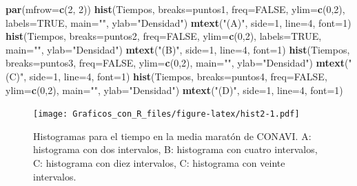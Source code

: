 \documentclass[10pt,]{krantz}
\makeatletter
\newenvironment{Shaded}{\begin{snugshade}}{\end{snugshade}}
\newcommand{\KeywordTok}[1]{\textcolor[rgb]{0.13,0.29,0.53}{\textbf{#1}}}
\newcommand{\DataTypeTok}[1]{\textcolor[rgb]{0.13,0.29,0.53}{#1}}
\newcommand{\DecValTok}[1]{\textcolor[rgb]{0.00,0.00,0.81}{#1}}
\newcommand{\StringTok}[1]{\textcolor[rgb]{0.31,0.60,0.02}{#1}}
\newcommand{\OtherTok}[1]{\textcolor[rgb]{0.56,0.35,0.01}{#1}}
\newcommand{\NormalTok}[1]{#1}
\newenvironment{kframe}{%
\medskip{}
\setlength{\fboxsep}{.8em}
 \def\at@end@of@kframe{}%
 \ifinner\ifhmode%
  \def\at@end@of@kframe{\end{minipage}}%
  \begin{minipage}{\columnwidth}%
 \fi\fi%
 \def\FrameCommand##1{\hskip\@totalleftmargin \hskip-\fboxsep
 \colorbox{shadecolor}{##1}\hskip-\fboxsep
     \hskip-\linewidth \hskip-\@totalleftmargin \hskip\columnwidth}%
 \MakeFramed {\advance\hsize-\width
   \@totalleftmargin\z@ \linewidth\hsize
   \@setminipage}}%
 {\par\unskip\endMakeFramed%
 \at@end@of@kframe}
\renewenvironment{Shaded}{\begin{kframe}}{\end{kframe}}
\makeatother
\begin{document}
\begin{Shaded}
\begin{Highlighting}[]
\KeywordTok{par}\NormalTok{(}\DataTypeTok{mfrow=}\KeywordTok{c}\NormalTok{(}\DecValTok{2}\NormalTok{, }\DecValTok{2}\NormalTok{))}
\KeywordTok{hist}\NormalTok{(Tiempos, }\DataTypeTok{breaks=}\NormalTok{puntos1, }\DataTypeTok{freq=}\OtherTok{FALSE}\NormalTok{, }\DataTypeTok{ylim=}\KeywordTok{c}\NormalTok{(}\DecValTok{0}\NormalTok{,}\DecValTok{2}\NormalTok{), }\DataTypeTok{labels=}\OtherTok{TRUE}\NormalTok{,}
     \DataTypeTok{main=}\StringTok{""}\NormalTok{, }\DataTypeTok{ylab=}\StringTok{"Densidad"}\NormalTok{)}
\KeywordTok{mtext}\NormalTok{(}\StringTok{"(A)"}\NormalTok{, }\DataTypeTok{side=}\DecValTok{1}\NormalTok{, }\DataTypeTok{line=}\DecValTok{4}\NormalTok{, }\DataTypeTok{font=}\DecValTok{1}\NormalTok{)}
\KeywordTok{hist}\NormalTok{(Tiempos, }\DataTypeTok{breaks=}\NormalTok{puntos2, }\DataTypeTok{freq=}\OtherTok{FALSE}\NormalTok{, }\DataTypeTok{ylim=}\KeywordTok{c}\NormalTok{(}\DecValTok{0}\NormalTok{,}\DecValTok{2}\NormalTok{), }\DataTypeTok{labels=}\OtherTok{TRUE}\NormalTok{,}
     \DataTypeTok{main=}\StringTok{""}\NormalTok{, }\DataTypeTok{ylab=}\StringTok{"Densidad"}\NormalTok{)}
\KeywordTok{mtext}\NormalTok{(}\StringTok{"(B)"}\NormalTok{, }\DataTypeTok{side=}\DecValTok{1}\NormalTok{, }\DataTypeTok{line=}\DecValTok{4}\NormalTok{, }\DataTypeTok{font=}\DecValTok{1}\NormalTok{)}
\KeywordTok{hist}\NormalTok{(Tiempos, }\DataTypeTok{breaks=}\NormalTok{puntos3, }\DataTypeTok{freq=}\OtherTok{FALSE}\NormalTok{, }\DataTypeTok{ylim=}\KeywordTok{c}\NormalTok{(}\DecValTok{0}\NormalTok{,}\DecValTok{2}\NormalTok{),}
     \DataTypeTok{main=}\StringTok{""}\NormalTok{, }\DataTypeTok{ylab=}\StringTok{"Densidad"}\NormalTok{)}
\KeywordTok{mtext}\NormalTok{(}\StringTok{"(C)"}\NormalTok{, }\DataTypeTok{side=}\DecValTok{1}\NormalTok{, }\DataTypeTok{line=}\DecValTok{4}\NormalTok{, }\DataTypeTok{font=}\DecValTok{1}\NormalTok{)}
\KeywordTok{hist}\NormalTok{(Tiempos, }\DataTypeTok{breaks=}\NormalTok{puntos4, }\DataTypeTok{freq=}\OtherTok{FALSE}\NormalTok{, }\DataTypeTok{ylim=}\KeywordTok{c}\NormalTok{(}\DecValTok{0}\NormalTok{,}\DecValTok{2}\NormalTok{),}
     \DataTypeTok{main=}\StringTok{""}\NormalTok{, }\DataTypeTok{ylab=}\StringTok{"Densidad"}\NormalTok{)}
\KeywordTok{mtext}\NormalTok{(}\StringTok{"(D)"}\NormalTok{, }\DataTypeTok{side=}\DecValTok{1}\NormalTok{, }\DataTypeTok{line=}\DecValTok{4}\NormalTok{, }\DataTypeTok{font=}\DecValTok{1}\NormalTok{)}
\end{Highlighting}
\end{Shaded}

\begin{figure}
\centering
\texttt{[image: Graficos\_con\_R\_files/figure-latex/hist2-1.pdf]}
\caption{\label{fig:hist2}Histogramas para el tiempo en la media maratón de
CONAVI. A: histograma con dos intervalos, B: histograma con cuatro
intervalos, C: histograma con diez intervalos, C: histograma con veinte
intervalos.}
\end{figure}
\end{document}
